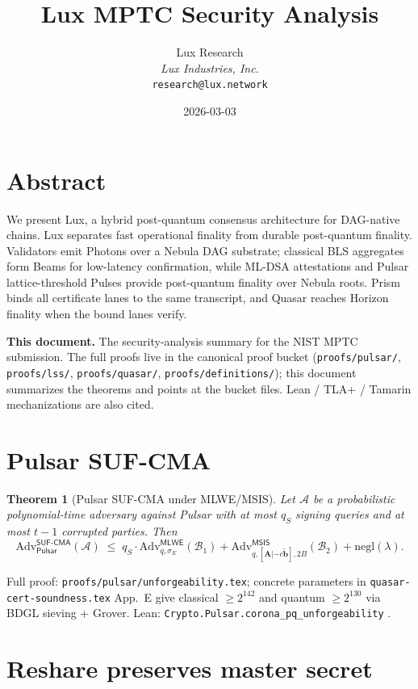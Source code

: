 \documentclass[11pt,a4paper]{article}
\title{Lux MPTC Security Analysis}
\author{
Lux Research\\
\textit{Lux Industries, Inc.}\\
\texttt{research@lux.network}
}
\date{2026-03-03}
\newtheorem{theorem}{Theorem}
\begin{document}
\luxcoverpage

\section*{Abstract}

\noindent We present Lux, a hybrid post-quantum consensus architecture for DAG-native chains. Lux separates fast operational finality from durable post-quantum finality. Validators emit Photons over a Nebula DAG substrate; classical BLS aggregates form Beams for low-latency confirmation, while ML-DSA attestations and Pulsar lattice-threshold Pulses provide post-quantum finality over Nebula roots. Prism binds all certificate lanes to the same transcript, and Quasar reaches Horizon finality when the bound lanes verify.

\textbf{This document.} The security-analysis summary for the NIST MPTC submission. The full proofs live in the canonical proof bucket (\texttt{proofs/pulsar/}, \texttt{proofs/lss/}, \texttt{proofs/quasar/}, \texttt{proofs/definitions/}); this document summarizes the theorems and points at the bucket files. Lean / TLA+ / Tamarin mechanizations are also cited.

\section{Pulsar SUF-CMA}

\begin{theorem}[Pulsar SUF-CMA under MLWE/MSIS]
\label{thm:pulsar-suf-cma-sec}
Let $\mathcal{A}$ be a probabilistic polynomial-time adversary against Pulsar with at most $q_S$ signing queries and at most $t-1$ corrupted parties. Then
\[
  \mathrm{Adv}^{\mathsf{SUF\text{-}CMA}}_{\mathsf{Pulsar}}(\mathcal{A})
  \;\leq\; q_S \cdot \mathrm{Adv}^{\mathsf{MLWE}}_{q, \sigma_E}(\mathcal{B}_1)
  + \mathrm{Adv}^{\mathsf{MSIS}}_{q, [\mathbf{A}|-c\tilde{\mathbf{b}}], 2B}(\mathcal{B}_2)
  + \mathrm{negl}(\lambda).
\]
\end{theorem}

Full proof: \texttt{proofs/pulsar/unforgeability.tex}; concrete parameters in \texttt{quasar-cert-soundness.tex} App.~E give classical $\geq 2^{142}$ and quantum $\geq 2^{130}$ via BDGL sieving + Grover. Lean: \texttt{Crypto.Pulsar.corona\_pq\_unforgeability} \cite{leancrypto}.

\section{Reshare preserves master secret}
\end{document}
